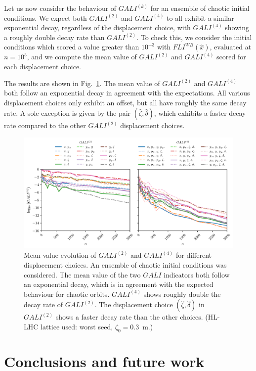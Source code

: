Let us now consider the behaviour of $GALI^{(k)}$ for an ensemble of chaotic initial conditions. We expect both $GALI^{(2)}$ and $GALI^{(4)}$ to all exhibit a similar exponential decay, regardless of the displacement choice, with $GALI^{(4)}$ showing a roughly double decay rate than $GALI^{(2)}$. To check this, we consider the initial conditions which scored a value greater than $10^{-3}$ with $FLI^{WB}(\hat{x})$, evaluated at $n=10^{5}$, and we compute the mean value of $GALI^{(2)}$ and $GALI^{(4)}$ scored for each displacement choice.

The results are shown in Fig.~\ref{fig:gali2_4_chaos}. The mean value of $GALI^{(2)}$ and $GALI^{(4)}$ both follow an exponential decay in agreement with the expectations. All various displacement choices only exhibit an offset, but all have roughly the same decay rate. A sole exception is given by the pair $(\hat{\zeta}, \hat{\delta})$, which exhibits a faster decay rate compared to the other $GALI^{(2)}$ displacement choices.  

\begin{figure}
    \centering
    \includegraphics[width=1.0\textwidth]{6_lhc_dynamic_indicators/figs/gali_2_4_chaos.pdf}
    \caption{Mean value evolution of $GALI^{(2)}$ and $GALI^{(4)}$ for different displacement choices. An ensemble of chaotic initial conditions was considered. The mean value of the two $GALI$ indicators both follow an exponential decay, which is in agreement with the expected behaviour for chaotic orbits. $GALI^{(4)}$ shows roughly double the decay rate of $GALI^{(2)}$. The displacement choice $(\hat{\zeta}, \hat{\delta})$ in $GALI^{(2)}$ shows a faster decay rate than the other choices. (HL-LHC lattice used: worst seed, $\zeta_0=$\SI{0.3}{\meter}.)}
    \label{fig:gali2_4_chaos}
\end{figure}


\section{Conclusions and future work}\label{sec:8:conclusions}

